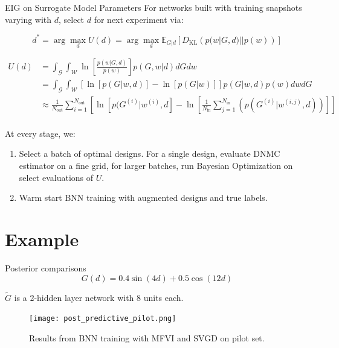 \documentclass[usenames,dvipsnames,aspectratio=169]{beamer}
\theoremstyle{definition}
\begin{document}
\begin{frame}{EIG on Surrogate Model Parameters}
    For networks built with training snapshots varying with $d$, select $d$ for next experiment via: 


    $$d^{\ast} = \arg \max_{d} U(d) = \arg \max_{d} \mathbb{E}_{G | d} \left[ D_{\text{KL}} \left(p(w | G, d) || p(w) \right)\right]$$

    \begin{align*}
        U(d) &= \int_{\mathcal{G}} \int_{\mathcal{W}} \ln \left[\frac{p(w | G, d)}{p(w)}\right]  p(G, w | d) dG dw \nonumber \\
        &= \int_{\mathcal{G}} \int_{\mathcal{W}} \left[\ln[p(G| w, d)] - \ln[p(G | w)]\right] p(G | w, d) p(w) dw dG \nonumber \\
        &\approx \frac{1}{N_{\textrm{out}}} \sum_{i=1}^{N_{\textrm{out}}}\left[\ln[p(G^{(i)} | w^{(i)}, d] - \ln \left[\frac{1}{N_{\textrm{in}}}\sum_{j=1}^{N_{\textrm{in}}}(p(G^{(i)} | w^{(i, j)}, d))\right]\right] \nonumber \\
        \label{eq: util} \nonumber
    \end{align*}

    At every stage, we:
    \begin{enumerate}
        \item Select a batch of optimal designs. For a single design, evaluate DNMC estimator on a fine grid, for larger batches, run Bayesian Optimization on select evaluations of $U$.
        
        \item Warm start BNN training with augmented designs and true labels.
    \end{enumerate}

\end{frame}


\section{Example}
\begin{frame}{Posterior comparisons}
\begin{equation*}
    G(d) = 0.4 \sin(4d) + 0.5 \cos(12d)
\end{equation*}

$\tilde{G}$ is a 2-hidden layer network with 8 units each.
\begin{figure}
    \centering
    \texttt{[image: post\_predictive\_pilot.png]}
    \caption{Results from BNN training with MFVI and SVGD on pilot set.}
\end{figure}
\end{frame}
\end{document}
